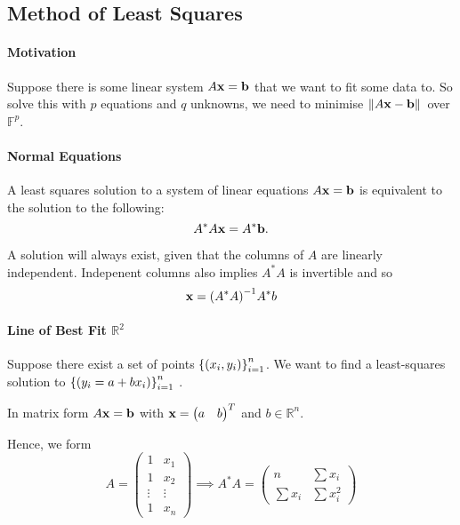 %
%
%
\subsection{Method of Least Squares}

\paragraph{Motivation}
Suppose there is some linear system \( A \mathbf{x} = \mathbf{b} \) that we want
to fit some data to.
So solve this with \( p \) equations and \( q \) unknowns, we need to minimise
\( \norm*{A\mathbf{x} - \mathbf{b}} \) over \( \mathbb{F}^p \).

\paragraph{Normal Equations}
A least squares solution to a system of linear equations \( A\mathbf{x} = \mathbf{b} \)
is equivalent to the solution to the following: \[
    A^* A \mathbf{x} = A^* \mathbf{b}
.\]

A solution will always exist, given that the columns of \( A \) are linearly
independent. Indepenent columns also implies \( A^* A \) is invertible and so \[
    \mathbf{x} = {(A^* A)}^{-1} A^* b
\]

\paragraph{Line of Best Fit \( \mathbb{R}^2 \)}
Suppose there exist a set of points \( {\left\{ (x_i, y_i) \right\}_{i =1}^n} \).
We want to find a least-squares solution to
\( {\left\{ (y_i = a + bx_i) \right\}_{i =1}^n} \ \).

In matrix form \( A \mathbf{x} = \mathbf{b} \) with \( \mathbf{x} = \begin{pmatrix}
    a & b
\end{pmatrix}^T \) and \( b \in \mathbb{R}^n \).

Hence, we form \[
    A = \begin{pmatrix}
        1 & x_1 \\
        1 & x_2 \\
        \vdots & \vdots \\
        1 & x_n
    \end{pmatrix}
    \implies
    A^* A = \begin{pmatrix}
        n        & \sum x_i \\
        \sum x_i & \sum x_i^2
    \end{pmatrix}
\]
